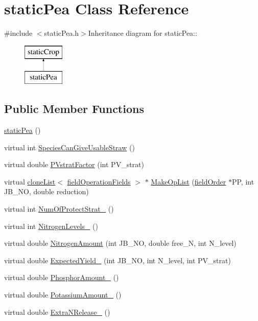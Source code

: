 \hypertarget{classstatic_pea}{
\section{staticPea Class Reference}
\label{classstatic_pea}
}


{\ttfamily \#include $<$staticPea.h$>$}Inheritance diagram for staticPea::\begin{figure}[H]
\begin{center}
\leavevmode
\includegraphics[height=2cm]{classstatic_pea}
\end{center}
\end{figure}
\subsection*{Public Member Functions}
\begin{DoxyCompactItemize}
\item 
\hyperlink{classstatic_pea_a95e2886088aebc737f1d998e48b4c691}{staticPea} ()
\item 
virtual int \hyperlink{classstatic_pea_a368cb5d2d6f10edb9d8aecde2e2d7b9b}{SpeciesCanGiveUsableStraw} ()
\item 
virtual double \hyperlink{classstatic_pea_adaf16829a2d0bece8f22018377a89fd9}{PVstratFactor} (int PV\_\-strat)
\item 
virtual \hyperlink{classclone_list}{cloneList}$<$ \hyperlink{classfield_operation_fields}{fieldOperationFields} $>$ $\ast$ \hyperlink{classstatic_pea_a4e65ffc0e08921e18f95be49b3e12422}{MakeOpList} (\hyperlink{classfield_order}{fieldOrder} $\ast$PP, int JB\_\-NO, double reduction)
\item 
virtual int \hyperlink{classstatic_pea_a9ce174ccebfdb6f1494b5cbc8ed26e65}{NumOfProtectStrat\_\-} ()
\item 
virtual int \hyperlink{classstatic_pea_ac4186d94b140bb10e0817f4273ae4f9d}{NitrogenLevels\_\-} ()
\item 
virtual double \hyperlink{classstatic_pea_a617c3f2666334b3e86ad4ca3e105afc8}{NitrogenAmount} (int JB\_\-NO, double free\_\-N, int N\_\-level)
\item 
virtual double \hyperlink{classstatic_pea_ade12e48b5d12ee356da9c38908cc8e07}{ExpectedYield\_\-} (int JB\_\-NO, int N\_\-level, int PV\_\-strat)
\item 
virtual double \hyperlink{classstatic_pea_a8142c951a5471b430813637a7a21e7d7}{PhosphorAmount\_\-} ()
\item 
virtual double \hyperlink{classstatic_pea_a6e42e1210858f6b85749979418a4c0ad}{PotassiumAmount\_\-} ()
\item 
virtual double \hyperlink{classstatic_pea_afff094d1caf8424d869bb8623284b536}{ExtraNRelease\_\-} ()
\end{DoxyCompactItemize}
